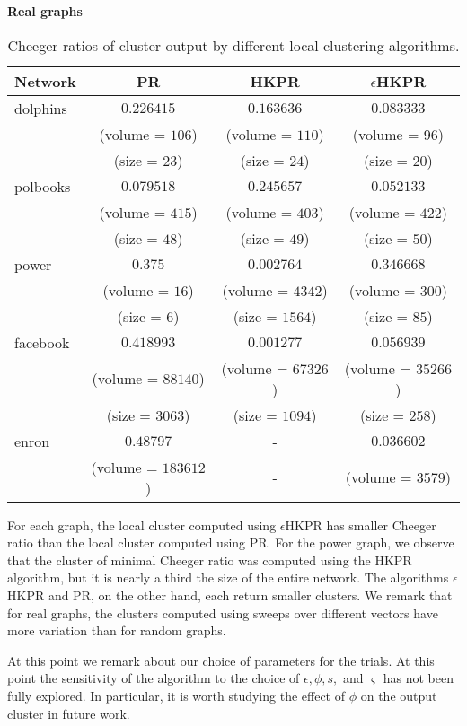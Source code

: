 \documentclass[runningheads,a4paper]{llncs}
\begin{document}
\begin{table}
\centering
\textbf{Real graphs}\\
\begin{tabular}{|p{2cm}|c|c|c|}
\hline
\multicolumn{1}{|c|}{Network} & PR & HKPR & $\epsilon$HKPR\\
\hline\hline
dolphins & $0.226415$ & $0.163636$ & $0.083333$ \\
         & (volume = $106$) & (volume = $110$) & (volume = $96$)\\
         & (size = $23$) & (size = $24$) & (size = $20$)\\\hline
polbooks & $0.079518$ & $0.245657$ & $0.052133$\\
         & (volume = $415$) & (volume = $403$) & (volume = $422$)\\
         & (size = $48$) & (size = $49$) & (size = $50$)\\\hline
power    & $0.375$    & $0.002764$ & $0.346668$ \\
         & (volume = $16$) & (volume = $4342$) & (volume = $300$)\\
         & (size = $6$) & (size = $1564$) & (size = $85$)\\\hline
facebook & $0.418993$ & $0.001277$ & $0.056939$ \\
         & (volume = $88140$) & (volume = $67326$) & (volume = $35266$)\\
         & (size = $3063$) & (size = $1094$) & (size = $258$)\\\hline
enron    & $0.48797$ & - & $0.036602$\\
         & (volume = $183612$) & - &  (volume = $3579$)\\
\hline 
\end{tabular}
\caption{Cheeger ratios of cluster output by different local clustering
algorithms.}
\label{table:cheegerreal}
\end{table}

For each graph, the local cluster computed using $\epsilon$HKPR has smaller
Cheeger ratio than the local cluster computed using PR.  For the power graph, we
observe that the cluster of minimal Cheeger ratio was computed using the HKPR
algorithm, but it is nearly a third the size of the entire network.  The
algorithms $\epsilon$HKPR and PR, on the other hand, each return smaller
clusters.  We remark that for real graphs, the clusters computed using sweeps
over different vectors have more variation than for random graphs.

At this point we remark about our choice of parameters for the trials.  At this
point the sensitivity of the algorithm to the choice of $\epsilon, \phi, s,$ and
$\varsigma$ has not been fully explored.  In particular, it is worth studying
the effect of $\phi$ on the output cluster in future work.
\end{document}

